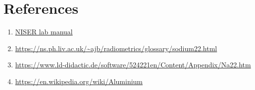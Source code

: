 \documentclass[a4paper, amsfonts, amssymb, amsmath, reprint, showkeys, nofootinbib, twoside]{revtex4-1}
\begin{document}
\section{References}
\begin{enumerate}
\item{\url{NISER lab manual}}
\item{\url{https://ns.ph.liv.ac.uk/~ajb/radiometrics/glossary/sodium22.html}}
\item {\url{https://www.ld-didactic.de/software/524221en/Content/Appendix/Na22.htm}}
\item {\url{https://en.wikipedia.org/wiki/Aluminium}}
\end{enumerate}
\end{document}
